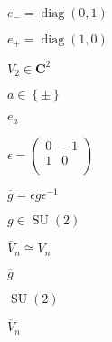 \begin{preview}
\setcounter{equation}{0}%
\( e_- = \operatorname{diag}(0,1) \)
\end{preview}

\begin{preview}
\setcounter{equation}{0}%
\( e_+ = \operatorname{diag}(1,0) \)
\end{preview}

\begin{preview}
\setcounter{equation}{0}%
\( V_2 \in \mathbf{C}^2 \)
\end{preview}

\begin{preview}
\setcounter{equation}{0}%
\( a\in  \left\{ \pm \right\} \)
\end{preview}

\begin{preview}
\setcounter{equation}{0}%
\( e_a \)
\end{preview}

\begin{preview}
\setcounter{equation}{0}%
\( \epsilon =\begin{pmatrix}0 & -1 \\1 & 0 \\\end{pmatrix}\)
\end{preview}

\begin{preview}
\setcounter{equation}{0}%
\( \overline{g} = \epsilon g \epsilon ^{-1}\)
\end{preview}

\begin{preview}
\setcounter{equation}{0}%
\( g\in \operatorname{SU}(2) \)
\end{preview}

\begin{preview}
\setcounter{equation}{0}%
\( \overline{V}_n  \cong V_{n} \)
\end{preview}

\begin{preview}
\setcounter{equation}{0}%
\( \overline{g} \)
\end{preview}

\begin{preview}
\setcounter{equation}{0}%
\( \operatorname{SU}(2) \)
\end{preview}

\begin{preview}
\setcounter{equation}{0}%
\( \overline{V}_n \)
\end{preview}

